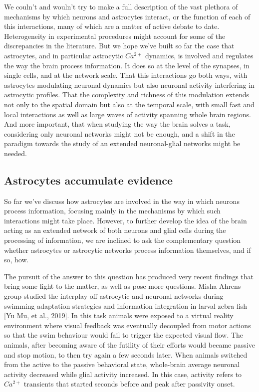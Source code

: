 We couln't and wouln't try to make a full description of the vast plethora of mechanisms by which neurons and astrocytes interact, or the function of each of this interactions, many of which are a matter of active debate to date. 
Heterogeneity in experimental procedures might account for some of the discrepancies in the literature.
But we hope we've built so far the case that astrocytes, and in particular astrocytic $Ca^{2+}$ dynamics, is involved and regulates the way the brain process information.
It does so at the level of the synapses, in single cells, and at the network scale.
That this interactions go both ways, with astrocytes modulating neuronal dynamics but also neuronal activity interfering in astrocytic profiles.
That the complexity and richness of this modulation extends not only to the spatial domain but also at the temporal scale, with small fast and local interactions as well as large waves of activity spanning whole brain regions.
And more important, that when studying the way the brain solves a task, considering only neuronal networks might not be enough, and a shift in the paradigm towards the study of an extended neuronal-glial networks might be needed. 

\subsection{Astrocytes accumulate evidence}
\label{chap1:sec:2:subsec4:astro_evidence}
So far we've discuss how astrocytes are involved in the way in which neurons process information, focusing mainly in the mechanisms by which such interactions might take place.
However, to further develop the idea of the brain acting as an extended network of both neurons and glial cells during the processing of information, we are inclined to ask the complementary question whether astrocytes or astrocytic networks process information themselves, and if so, how. 

The pursuit of the answer to this question has produced very recent findings that bring some light to the matter, as well as pose more questions. 
Misha Ahrens group studied the interplay off astrocytic and neuronal networks during swimming adaptation strategies and information integration in larval zebra fish [Yu Mu, et al., 2019]. 
In this task animals were exposed to a virtual reality environment where visual feedback was eventually decoupled from motor actions so that the swim behaviour would fail to trigger the expected visual flow. 
The animals, after becoming aware of the futility of their efforts would became passive and stop motion, to then try again a few seconds later. 
When animals switched from the active to the passive behavioral state, whole-brain average neuronal activity decreased while glial activity increased. 
In this case, activity refers to $Ca^{2+}$ transients that started seconds before and peak after passivity onset. 

